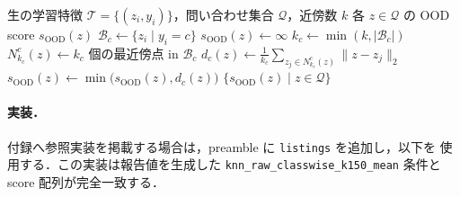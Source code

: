 \begin{algorithm}[H]
  \caption{\CWKNN による OOD score の計算}
  \label{alg:cwknn}
  \begin{algorithmic}[1]
    \Require 生の学習特徴 $\mathcal{T}=\{(z_i,y_i)\}$，問い合わせ集合
      $\mathcal{Q}$，近傍数 $k$
    \Ensure 各 $z\in\mathcal{Q}$ の OOD score $s_{\mathrm{OOD}}(z)$
      \State $\mathcal{B}_c\gets\{z_i\mid y_i=c\}$
    \EndFor
      \State $s_{\mathrm{OOD}}(z)\gets\infty$
        \State $k_c\gets\min(k,|\mathcal{B}_c|)$
        \State $N_{k_c}^{c}(z)\gets k_c$ 個の最近傍点 in $\mathcal{B}_c$
        \State $d_c(z)\gets\frac{1}{k_c}
          \sum_{z_j\in N_{k_c}^{c}(z)}\lVert z-z_j\rVert_2$
        \State $s_{\mathrm{OOD}}(z)\gets
          \min\bigl(s_{\mathrm{OOD}}(z),d_c(z)\bigr)$
      \EndFor
    \EndFor
    \State \Return $\{s_{\mathrm{OOD}}(z)\mid z\in\mathcal{Q}\}$
  \end{algorithmic}
\end{algorithm}

\paragraph{実装．}
付録へ参照実装を掲載する場合は，preamble に \texttt{listings} を追加し，以下を
使用する．この実装は報告値を生成した
\texttt{knn\_raw\_classwise\_k150\_mean} 条件と score 配列が完全一致する．


